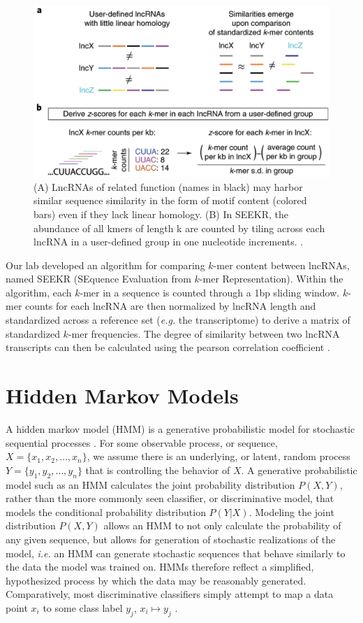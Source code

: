  \begin{figure}[t!]
\centering
\includegraphics[width=.8\textwidth]{images/seekrclip.png}
\caption[SEEKR Algorithm]{(A) LncRNAs of related function (names in black) may harbor similar sequence similarity in the form of motif content (colored bars) even if they lack linear homology. (B) In SEEKR, the abundance of all kmers of length k are counted by tiling across each lncRNA in a user-defined group in one nucleotide increments. \cite{Kirk2018FunctionalContent}.}
\label{fig:seekr}
\end{figure}

Our lab developed an algorithm for comparing $k$-mer content between lncRNAs, named SEEKR (SEquence Evaluation from $k$-mer Representation). Within the algorithm, each $k$-mer in a sequence is counted through a 1bp sliding window. $k$-mer counts for each lncRNA are then normalized by lncRNA length and standardized across a reference set (\emph{e.g.} the transcriptome) to derive a matrix of standardized $k$-mer frequencies. The degree of similarity between two lncRNA transcripts can then be calculated using the pearson correlation coefficient \cite{Kirk2018FunctionalContent}.


\section{Hidden Markov Models}
A hidden markov model (HMM) is a generative probabilistic model for stochastic sequential processes \cite{Rabiner1989ARecognition,Burge1997PredictionDNA}. For some observable process, or sequence, $X = \{x_1,x_2,\dots, x_n\}$, we assume there is an underlying, or latent, random process $Y = \{y_1,y_2,\dots,y_n\}$ that is controlling the behavior of $X$. A generative probabilistic model such as an HMM calculates the joint probability distribution $P(X,Y)$, rather than the more commonly seen classifier, or discriminative model, that models the conditional probability distribution $P(Y|X)$. Modeling the joint distribution $P(X,Y)$ allows an HMM to not only calculate the probability of any given sequence, but allows for generation of stochastic realizations of the model, \emph{i.e.} an HMM can generate stochastic sequences that behave similarly to the data the model was trained on. HMMs therefore reflect a simplified, hypothesized process by which the data may be reasonably generated. Comparatively, most discriminative classifiers simply attempt to map a data point $x_i$ to some class label $y_j$, $x_i\mapsto y_j$ \cite{Ng2002OnBayes}.

